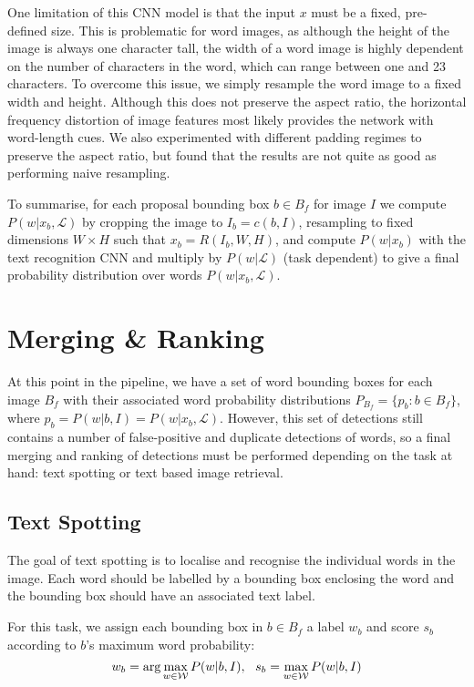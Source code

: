 \documentclass[twocolumn]{svjour3}          \smartqed  \usepackage{epsfig}
\begin{document}
One limitation of this CNN model is that the input $x$ must be a fixed, pre-defined size. This is problematic for word images, as although the height of the image is always one character tall, the width of a word image is highly dependent on the number of characters in the word, which can range between one and 23 characters. To overcome this issue, we simply resample the word image to a fixed width and height. Although this does not preserve the aspect ratio, the horizontal frequency distortion of image features most likely provides the network with word-length cues. We also experimented with different padding regimes to preserve the aspect ratio, but found that the results are not quite as good as performing naive resampling. 

To summarise, for each proposal bounding box $b \in B_f$ for image $I$ we compute $P(w|x_b,\mathcal{L})$ by cropping the image to $I_b = c(b,I)$, resampling to fixed dimensions $W \times H$ such that $x_b = R(I_b, W, H)$, and compute $P(w|x_b)$ with the text recognition CNN and multiply by $P(w|\mathcal{L})$ (task dependent) to give a final probability distribution over words $P(w|x_b,\mathcal{L})$.

\section{Merging \& Ranking}
\label{sec:merging}
At this point in the pipeline, we have a set of word bounding boxes for each image $B_f$ with their associated word probability distributions $P_{B_f} = \{p_b : b \in B_f\}$, where $p_b = P(w|b,I) =  P(w|x_b,\mathcal{L})$. However, this set of detections still contains a number of false-positive and duplicate detections of words, so a final merging and ranking of detections must be performed depending on the task at hand: text spotting or text based image retrieval.

\subsection{Text Spotting}
The goal of text spotting is to localise and recognise the individual words in the image. Each word should be labelled by a bounding box enclosing the word and the bounding box should have an associated text label.

For this task, we assign each bounding box in $b \in B_f$ a label $w_b$ and score $s_b$ according to $b$'s maximum word probability:
\begin{equation}
w_b = \arg\max_{w \in \mathcal{W}} P(w|b,I),~~s_b = \max_{w \in \mathcal{W}} P(w|b,I)
\end{equation}
\end{document}
